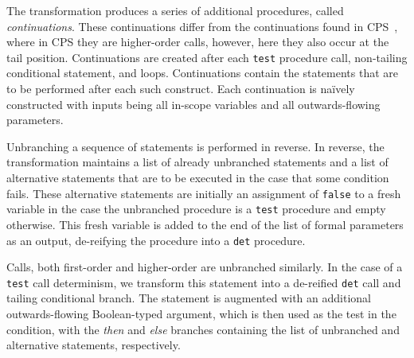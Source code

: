 The transformation produces a series of additional procedures, called \textit{continuations}. These continuations differ from the continuations found in CPS~\cite{appel1989continuation}, where in CPS they are higher-order calls, however, here they also occur at the tail position. Continuations are created after each \texttt{test} procedure call, non-tailing conditional statement, and loops. Continuations contain the statements that are to be performed after each such construct. Each continuation is na\"ively constructed with inputs being all in-scope variables and all outwards-flowing parameters.

Unbranching a sequence of statements is performed in reverse. In reverse, the transformation maintains a list of already unbranched statements and a list of alternative statements that are to be executed in the case that some condition fails. These alternative statements are initially an assignment of \texttt{false} to a fresh variable in the case the unbranched procedure is a \texttt{test} procedure and empty otherwise. This fresh variable is added to the end of the list of formal parameters as an output, de-reifying the procedure into a \texttt{det} procedure.

Calls, both first-order and higher-order are unbranched similarly. In the case of a \texttt{test} call determinism, we transform this statement into a de-reified \texttt{det} call and tailing conditional branch. The statement is augmented with an additional outwards-flowing Boolean-typed argument, which is then used as the test in the condition, with the \textit{then} and \textit{else} branches containing the list of unbranched and alternative statements, respectively.

